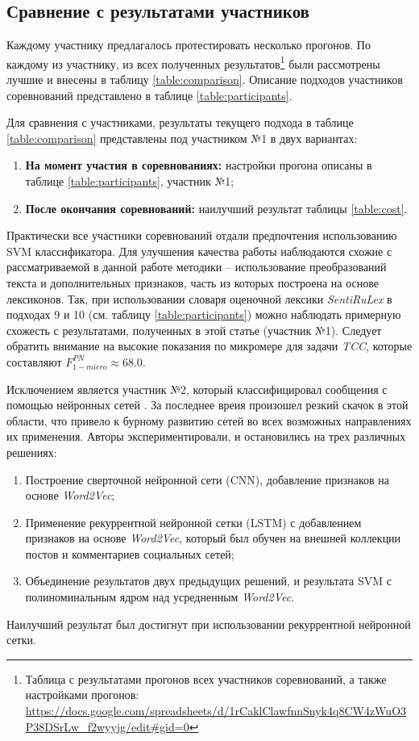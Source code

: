 \subsection{Сравнение с результатами участников}
Каждому участнику предлагалось протестировать несколько прогонов.
По каждому из участнику, из всех полученных результатов\footnote{
    Таблица с результатами прогонов всех участников соревнований, а также
    настройками прогонов:
    \url{https://docs.google.com/spreadsheets/d/1rCaklClawfnnSnyk4q8CW4zWuO3P38DSrLw_f2wyyjg/edit\#gid=0}
} были рассмотрены лучшие
и внесены в таблицу \ref{table:comparison}.
Описание подходов участников соревнований представлено в таблице
\ref{table:participants}.

Для сравнения с участниками, результаты текущего подхода в таблице
\ref{table:comparison} представлены под участником №1 в двух вариантах:
\begin{enumerate}
    \item {\bf На момент участия в соревнованиях:} настройки прогона описаны
        в таблице \ref{table:participants}, участник №1;
    \item {\bf После окончания соревнований:} наилучший результат таблицы \ref{table:cost}.
\end{enumerate}




Практически все участники соревнований отдали предпочтения использованию
SVM классификатора.
Для улучшения качества работы наблюдаются схожие с рассматриваемой в данной
работе методики -- использование преобразований текста и
дополнительных признаков, часть из которых построена на основе лексиконов.
Так, при использовании словаря оценочной лексики {\it SentiRuLex} в подходах 9 и 10
(см. таблицу \ref{table:participants}) можно наблюдать примерную схожесть с результатами,
полученных в этой статье (участник №1).
Следует обратить внимание на высокие показания по микромере для задачи {\it TCC},
которые составляют  $F_{1-micro}^{PN} \approx 68.0$.

Исключением является участник №2, который классифицировал сообщения с помощью
нейронных сетей \cite{neuralNetworks}.
За последнее вреия произошел резкий скачок в этой области, что привело
к бурному развитию сетей во всех возможных направлениях их применения.
Авторы экспериментировали, и остановились на трех различных решениях:
\begin{enumerate}
    \item Построение сверточной нейронной сети (CNN), добавление признаков на
        основе {\it Word2Vec};
    \item Применение рекуррентной нейронной сетки (LSTM) с добавлением признаков
        на основе {\it Word2Vec}, который был обучен на внешней коллекции
        постов и комментариев социальных сетей;
    \item Объединение результатов двух предыдущих решений, и результата
        SVM с полиноминальным ядром над усредненным {\it Word2Vec}.
\end{enumerate}


Наилучший результат был достигнут при использовании рекуррентной нейронной сетки.
